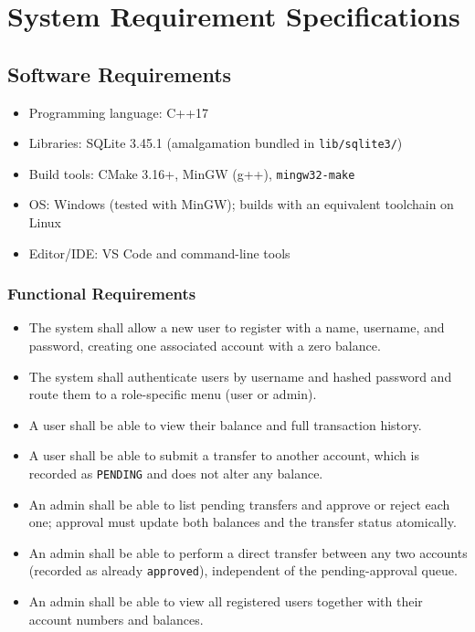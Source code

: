 \section{System Requirement Specifications}

\subsection{Software Requirements}
\begin{itemize}
    \item Programming language: C++17
    \item Libraries: SQLite 3.45.1 (amalgamation bundled in \texttt{lib/sqlite3/})
    \item Build tools: CMake 3.16+, MinGW (g++), \texttt{mingw32-make}
    \item OS: Windows (tested with MinGW); builds with an equivalent toolchain on Linux
    \item Editor/IDE: VS Code and command-line tools
\end{itemize}

\subsubsection{Functional Requirements}
\begin{itemize}
    \item The system shall allow a new user to register with a name, username, and password, creating one associated account with a zero balance.
    \item The system shall authenticate users by username and hashed password and route them to a role-specific menu (user or admin).
    \item A user shall be able to view their balance and full transaction history.
    \item A user shall be able to submit a transfer to another account, which is recorded as \texttt{PENDING} and does not alter any balance.
    \item An admin shall be able to list pending transfers and approve or reject each one; approval must update both balances and the transfer status atomically.
    \item An admin shall be able to perform a direct transfer between any two accounts (recorded as already \texttt{approved}), independent of the pending-approval queue.
    \item An admin shall be able to view all registered users together with their account numbers and balances.
\end{itemize}

